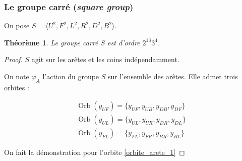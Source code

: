 \documentclass[10pt,notheorems]{beamer}
\theoremstyle{plain}
\newtheorem{theorem}{Théorème}[section]
\theoremstyle{definition}
\theoremstyle{plain}
\theoremstyle{plain}
\theoremstyle{plain}
\theoremstyle{remark}
\begin{document}
\begin{frame}
  \frametitle{Le groupe carré (\emph{square group})}

  On pose $S = \langle U ^2,  F ^2, L ^2, R ^2, D ^2, B ^2 \rangle $.

  \begin{theorem}
    Le groupe carré $S$ est d'ordre $2 ^{13} 3 ^{4}$.
  \end{theorem}

  \begin{proof}
  $S$ agit sur les arêtes et les coins indépendamment.

  On note $\varphi_A$ l'action du groupe $S$ sur l'ensemble des arêtes. Elle admet trois orbites :

  \begin{gather}
    \operatorname{Orb}(y _{UF}) = \{ y _{UF}, y _{UB}, y _{DB}, y _{DF} \} \label{orbite_arete_1}\\
    \operatorname{Orb}(y _{UL}) = \{ y _{UL}, y _{UR}, y _{DR}, y _{DL} \} \label{orbite_arete_2}\\
    \operatorname{Orb}(y _{FL}) = \{ y _{FL}, y _{FR}, y _{BR}, y _{BL} \} \label{orbite_arete_3}
  \end{gather}

  On fait la démonstration pour l'orbite \ref{orbite_arete_1}

  \end{proof}
\end{frame}
\end{document}
